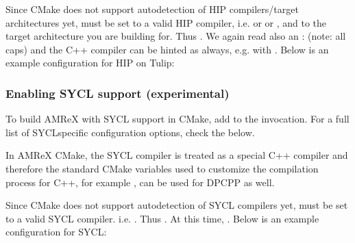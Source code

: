 \documentclass[letterpaper,10pt,english]{sphinxmanual}
\begin{document}
\sphinxAtStartPar
Since CMake does not support autodetection of HIP compilers/target architectures
yet,  must be set to a valid HIP compiler, i.e.  or  or ,
and  to the target architecture you are building for.
Thus .
We again read also an :  (note: all caps) and the C++ compiler can be hinted as always, e.g. with .
Below is an example configuration for HIP on Tulip:

\begin{sphinxVerbatim}[commandchars=\\\{\}]
\end{sphinxVerbatim}


\subsubsection{Enabling SYCL support (experimental)}
\label{\detokenize{GPU:enabling-sycl-support-experimental}}
\sphinxAtStartPar
To build AMReX with SYCL support in CMake, add
to the  invocation.
For a full list of SYCL\sphinxhyphen{}specific configuration options,
check the {\hyperref[\detokenize{GPU:tab-cmakesyclvar}]{}} below.

\sphinxAtStartPar
In AMReX CMake, the SYCL compiler is treated as a special C++ compiler and therefore
the standard CMake variables used to customize the compilation process for C++,
for example , can be used for DPCPP as well.

\sphinxAtStartPar
Since CMake does not support autodetection of SYCL compilers yet,
 must be set to a valid SYCL compiler. i.e. .
Thus .
At this time, .
Below is an example configuration for SYCL:
\end{document}
